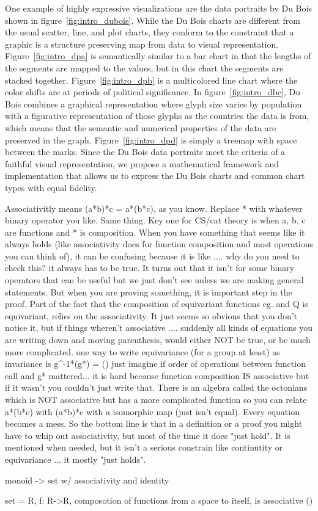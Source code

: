 One example of highly expressive visualizations are the data portraits by Du Bois shown in figure~\ref{fig:intro_dubois}. While the Du Bois charts are different from the usual scatter, line, and plot charts, they conform to the constraint that a graphic is a structure preserving map from data to visual representation. Figure~\ref{fig:intro_dpa} is semantically similar to a bar chart in that the lengths of the segments are mapped to the values, but in this chart the segments are stacked together. Figure~\ref{fig:intro_dpb} is a multicolored line chart where the color shifts are at periods of political significance. In figure~\ref{fig:intro_dbc}, Du Bois combines a graphical representation where glyph size varies by population with a figurative representation of those glyphs as the countries the data is from, which means that the semantic and numerical properties of the data are preserved in the graph. Figure~\ref{fig:intro_dpd} is simply a treemap\cite{heerTourVisualizationZoo2010} with space between the marks. Since the Du Bois data portraits meet the criteria of a faithful visual representation, we propose a mathematical framework and implementation that allows us to express the Du Bois charts and common chart types with equal fidelity. 


Associativitly means (a*b)*c = a*(b*c), as you know. Replace * with whatever binary operator you like. Same thing. Key one for CS/cat theory is when a, b, c are functions and * is composition. When you have something that seems like it always holds (like associativity does for function composition and most operations you can think of), it can be confusing because it is like .... why do you need to check this? it always has to be true.
It turns out that it isn't for some binary operators that can be useful but we just don't see unless we are making general statements.
But when you are proving something, it is important step in the proof.
Part of the fact that the composition of equivariant functions eg. \nu and Q is equivariant, relies on the associativity. It just seems so obvious that you don't notice it, but if things wheren't associative .... suddenly all kinds of equations you are writing down and moving parenthesis, would either NOT be true, or be much more complicated.
one way to write equivariance (for a group at least) as invariance is
g^-1*\nu(g*\tau) = \nu(\tau)
just imagine if order of operations between function call and g* mattered... it is hard because function composition IS associative but if it wasn't you couldn't just write that.
There is an algebra called the octonians which is NOT associative but has a more complicated function so you can relate a*(b*c) with (a*b)*c with a isomorphic map (just isn't equal). Every equation becomes a mess. So the bottom line is that in a definition or a proof you might have to whip out associativity, but most of the time it does "just hold". It is mentioned when needed, but it isn't a serious constrain like continutity or equivariance ... it mostly "just holds".

monoid -> set w/ associativity and identity

set = R, f: R->R, 
composotion of functions from a space to itself, is associative (\compo)
 